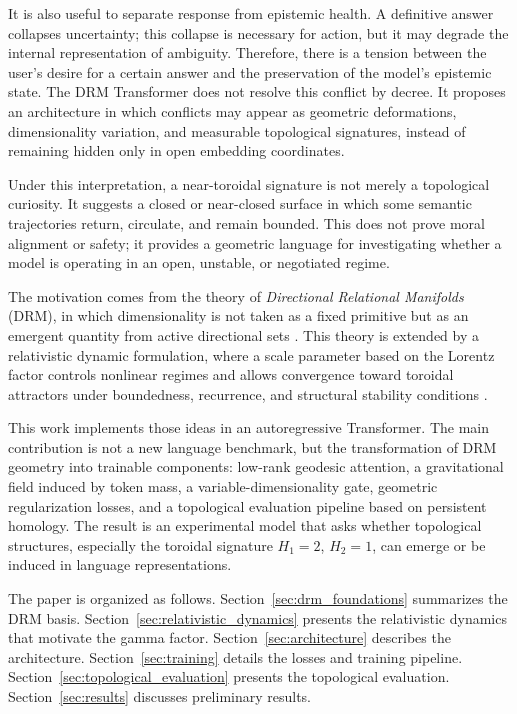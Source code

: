 It is also useful to separate response from epistemic health. A definitive
answer collapses uncertainty; this collapse is necessary for action, but it may
degrade the internal representation of ambiguity. Therefore, there is a tension
between the user's desire for a certain answer and the preservation of the
model's epistemic state. The DRM Transformer does not resolve this conflict by
decree. It proposes an architecture in which conflicts may appear as geometric
deformations, dimensionality variation, and measurable topological signatures,
instead of remaining hidden only in open embedding coordinates.

Under this interpretation, a near-toroidal signature is not merely a
topological curiosity. It suggests a closed or near-closed surface in which some
semantic trajectories return, circulate, and remain bounded. This does not
prove moral alignment or safety; it provides a geometric language for
investigating whether a model is operating in an open, unstable, or negotiated
regime.

The motivation comes from the theory of \emph{Directional Relational Manifolds}
(DRM), in which dimensionality is not taken as a fixed primitive but as an
emergent quantity from active directional sets \cite{muniz_drm_v11}. This
theory is extended by a relativistic dynamic formulation, where a scale
parameter based on the Lorentz factor controls nonlinear regimes and allows
convergence toward toroidal attractors under boundedness, recurrence, and
structural stability conditions \cite{muniz_relativistic_drm}.

This work implements those ideas in an autoregressive Transformer. The main
contribution is not a new language benchmark, but the transformation of DRM
geometry into trainable components: low-rank geodesic attention, a gravitational
field induced by token mass, a variable-dimensionality gate, geometric
regularization losses, and a topological evaluation pipeline based on
persistent homology. The result is an experimental model that asks whether
topological structures, especially the toroidal signature $H_1=2$, $H_2=1$, can
emerge or be induced in language representations.

The paper is organized as follows. Section~\ref{sec:drm_foundations}
summarizes the DRM basis. Section~\ref{sec:relativistic_dynamics} presents the
relativistic dynamics that motivate the gamma factor.
Section~\ref{sec:architecture} describes the architecture.
Section~\ref{sec:training} details the losses and training pipeline.
Section~\ref{sec:topological_evaluation} presents the topological evaluation.
Section~\ref{sec:results} discusses preliminary results.
